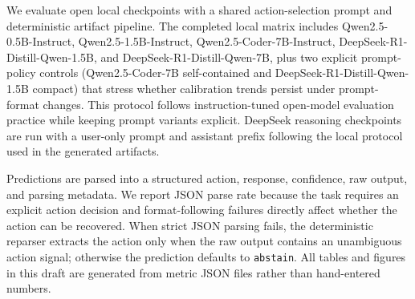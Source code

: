 We evaluate open local checkpoints with a shared action-selection prompt and deterministic artifact pipeline. The completed local matrix includes Qwen2.5-0.5B-Instruct, Qwen2.5-1.5B-Instruct, Qwen2.5-Coder-7B-Instruct, DeepSeek-R1-Distill-Qwen-1.5B, and DeepSeek-R1-Distill-Qwen-7B, plus two explicit prompt-policy controls (Qwen2.5-Coder-7B self-contained and DeepSeek-R1-Distill-Qwen-1.5B compact) that stress whether calibration trends persist under prompt-format changes. This protocol follows instruction-tuned open-model evaluation practice while keeping prompt variants explicit\citep{ouyang-etal-2022-instructgpt,touvron-etal-2023-llama,liang-etal-2023-helm,srivastava-etal-2023-bigbench}. DeepSeek reasoning checkpoints are run with a user-only prompt and assistant prefix following the local protocol used in the generated artifacts\citep{kadavath-etal-2022-language,kamath-etal-2020-selective}.

Predictions are parsed into a structured action, response, confidence, raw output, and parsing metadata. We report JSON parse rate because the task requires an explicit action decision and format-following failures directly affect whether the action can be recovered. When strict JSON parsing fails, the deterministic reparser extracts the action only when the raw output contains an unambiguous action signal; otherwise the prediction defaults to \texttt{abstain}. All tables and figures in this draft are generated from metric JSON files rather than hand-entered numbers.
